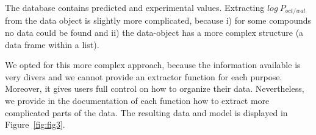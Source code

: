 \documentclass[article, shortnames]{jss}\usepackage[]{graphicx}\usepackage[]{color}
\providecommand{\DIFaddbegin}{} %
\providecommand{\DIFaddend}{} %
\providecommand{\DIFdelbegin}{} %
\providecommand{\DIFdelend}{} %
\begin{document}
The database contains predicted and experimental values.
Extracting $log~P_{oct/wat}$ from the data object is slightly more complicated,  
because i) for some compounds no data could be found and ii) the data-object has a more complex structure (a data frame within a list).

\DIFdelbegin %
\DIFdelend \DIFaddbegin \begin{CodeChunk}
\end{CodeChunk}
\DIFaddend 

We opted for this more complex approach, because the information available is very divers and we cannot provide an extractor function for each purpose.
Moreover, it gives users full control on how to organize their data. 
Nevertheless, we provide in the documentation of each function how to extract more complicated parts of the data.
The resulting data and model is displayed in Figure~\ref{fig:fig3}.
\end{document}
